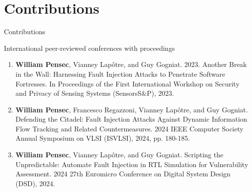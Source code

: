 \section*{Contributions}

\begin{frame}[allowframebreaks]{Contributions}
    \begin{block}{International peer-reviewed conferences with proceedings}
        \begin{enumerate}
            \item {\scriptsize\textbf{William Pensec}, Vianney Lapôtre, and Guy Gogniat. 2023. Another Break in the Wall: Harnessing Fault Injection Attacks to Penetrate Software Fortresses. In Proceedings of the First International Workshop on Security and Privacy of Sensing Systems (SensorsS\&P), 2023.~\cite{PLG-23-SensorsSP}}
            \item {\scriptsize\textbf{William Pensec}, Francesco Regazzoni, Vianney Lapôtre, and Guy Gogniat. Defending the Citadel: Fault Injection Attacks Against Dynamic Information Flow Tracking and Related Countermeasures. 2024 IEEE Computer Society Annual Symposium on VLSI (ISVLSI), 2024, pp. 180-185.~\cite{PRLG-24-isvlsi}}
            \item {\scriptsize\textbf{William Pensec}, Vianney Lapôtre, and Guy Gogniat. Scripting the Unpredictable: Automate Fault Injection in RTL Simulation for Vulnerability Assessment. 2024 27th Euromicro Conference on Digital System Design (DSD), 2024.~\cite{PLG-24-dsd}}
        \end{enumerate}
    \end{block}



\end{frame}
